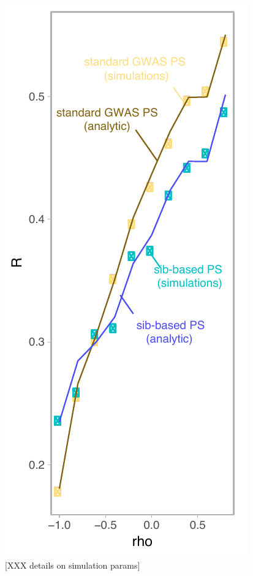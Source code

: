 \documentclass[hidelinks, 12pt]{article}
\begin{document}
\begin{figure}[!ht]
\centering
\includegraphics{supp_figures/R_vs_rho_indirect_simulation_and_analytic.pdf}
\caption{\small [XXX details on simulation params]}
\label{fig_R_vs_rho_sims}
\end{figure}
\end{document}
